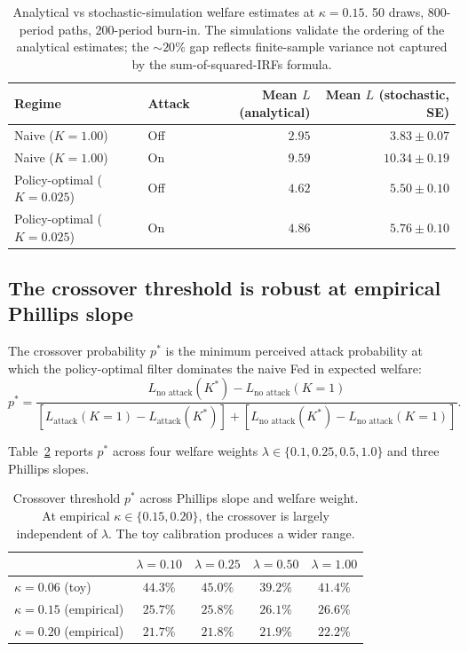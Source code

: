 \documentclass[12pt]{article}
\begin{document}
\begin{table}[h]
\centering
\small
\begin{tabular}{llrr}
\toprule
Regime & Attack & Mean \(L\) (analytical) & Mean \(L\) (stochastic, SE) \\
\midrule
Naive (\(K=1.00\)) & Off & \(2.95\) & \(3.83 \pm 0.07\) \\
Naive (\(K=1.00\)) & On & \(9.59\) & \(10.34 \pm 0.19\) \\
Policy-optimal (\(K=0.025\)) & Off & \(4.62\) & \(5.50 \pm 0.10\) \\
Policy-optimal (\(K=0.025\)) & On & \(4.86\) & \(5.76 \pm 0.10\) \\
\bottomrule
\end{tabular}
\caption{Analytical vs stochastic-simulation welfare estimates at \(\kappa = 0.15\). 50 draws, 800-period paths, 200-period burn-in. The simulations validate the ordering of the analytical estimates; the \(\sim 20\%\) gap reflects finite-sample variance not captured by the sum-of-squared-IRFs formula.}
\label{tab:stoch}
\end{table}

\subsection{The crossover threshold is robust at empirical Phillips slope}\label{sec:lambda}

The crossover probability \(p^*\) is the minimum perceived attack probability at which the policy-optimal filter dominates the naive Fed in expected welfare:
\[
p^* = \frac{L_{\text{no attack}}(K^*) - L_{\text{no attack}}(K = 1)}{\left[L_{\text{attack}}(K = 1) - L_{\text{attack}}(K^*)\right] + \left[L_{\text{no attack}}(K^*) - L_{\text{no attack}}(K = 1)\right]}.
\]

Table~\ref{tab:kappa_lambda} reports \(p^*\) across four welfare weights \(\lambda \in \{0.1, 0.25, 0.5, 1.0\}\) and three Phillips slopes.

\begin{table}[h]
\centering
\small
\begin{tabular}{lcccc}
\toprule
& \(\lambda = 0.10\) & \(\lambda = 0.25\) & \(\lambda = 0.50\) & \(\lambda = 1.00\) \\
\midrule
\(\kappa = 0.06\) (toy)         & \(44.3\%\) & \(45.0\%\) & \(39.2\%\) & \(41.4\%\) \\
\(\kappa = 0.15\) (empirical)   & \(25.7\%\) & \(25.8\%\) & \(26.1\%\) & \(26.6\%\) \\
\(\kappa = 0.20\) (empirical)   & \(21.7\%\) & \(21.8\%\) & \(21.9\%\) & \(22.2\%\) \\
\bottomrule
\end{tabular}
\caption{Crossover threshold \(p^*\) across Phillips slope and welfare weight. At empirical \(\kappa \in \{0.15, 0.20\}\), the crossover is largely independent of \(\lambda\). The toy calibration produces a wider range.}
\label{tab:kappa_lambda}
\end{table}
\end{document}
